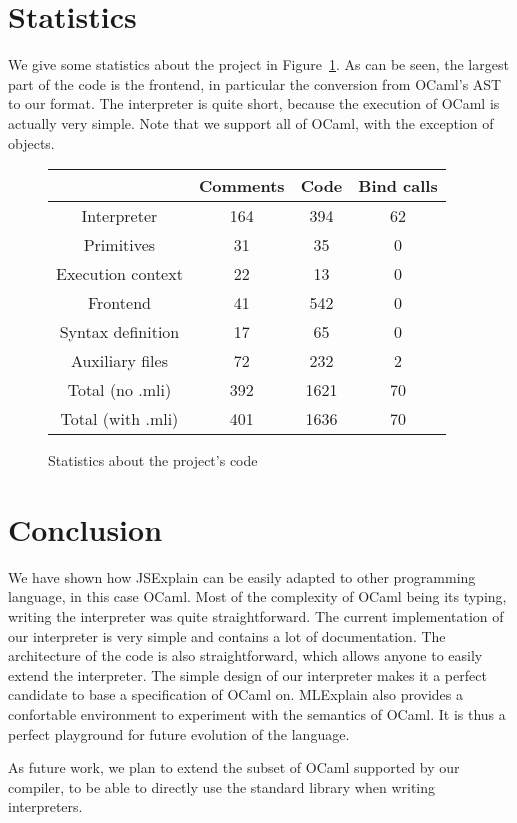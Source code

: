 \documentclass[twocolumn]{article}
\begin{document}
\section{Statistics}

We give some statistics about the project in Figure~\ref{fig:statistics}. As can
be seen, the largest part of the code is the frontend, in particular the
conversion from OCaml's AST to our format. The interpreter is quite short,
because the execution of OCaml is actually very simple. Note that we support all
of OCaml, with the exception of objects.

\begin{figure}[hb]
  \begin{tabular}{| c | c | c | c |}
    \hline
    & Comments & Code & Bind calls \\
    \hline
    Interpreter & 164 & 394 & 62 \\
    Primitives & 31 & 35 & 0 \\
    Execution context & 22 & 13 & 0 \\
    Frontend & 41 & 542 & 0 \\
    Syntax definition & 17 & 65 & 0 \\
    Auxiliary files & 72 & 232 & 2 \\
    \hline
    Total (no .mli) & 392 & 1621 & 70 \\
    Total (with .mli) & 401 & 1636 & 70 \\
    \hline
  \end{tabular}

  \centering
  \caption{Statistics about the project's code}
  \label{fig:statistics}
\end{figure}

\section{Conclusion}
We have shown how JSExplain can be easily adapted to other programming language,
in this case OCaml. Most of the complexity of OCaml being its typing, writing
the interpreter was quite straightforward. The current implementation of our
interpreter is very simple and contains a lot of documentation. The
architecture of the code is also straightforward, which allows anyone to easily
extend the interpreter. The simple design of our interpreter makes it a perfect
candidate to base a specification of OCaml on. MLExplain also provides a
confortable environment to experiment with the semantics of OCaml. It is thus a
perfect playground for future evolution of the language.

As future work, we plan to extend the subset of OCaml supported by our
compiler, to be able to directly use the standard library when writing
interpreters.



\end{document}
